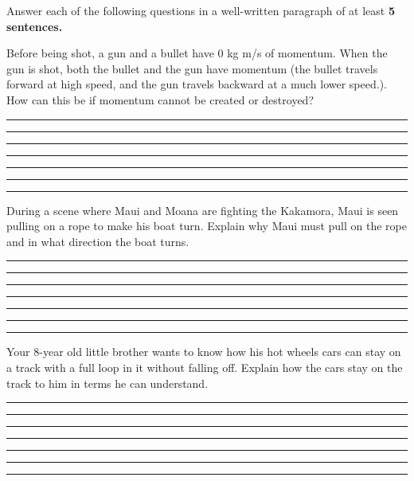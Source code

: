 \documentclass[12pt]{examdesign}
\begin{document}
		
\pagebreak
\begin{shortanswer}  [title={Essay Questions}, rearrange=no]
Answer each of the following questions in a well-written paragraph of at least\textbf{ 5 sentences.}  
	\begin{question}
	Before being shot, a gun and a bullet have 0 kg m/s of momentum.  When the gun is shot, both the bullet and the gun have momentum (the bullet travels forward at high speed, and the gun travels backward at a much lower speed.).  How can this be if momentum cannot be created or destroyed?
	\vspace{.25 in}
	\hrule
	\vspace{.25 in}
	\hrule
	\vspace{.25 in}
	\hrule
	\vspace{.25 in}
	\hrule
	\vspace{.25 in}
	\hrule
	\vspace{.25 in}
	\hrule
	\vspace{.25 in}
	\hrule
	\vspace{1cm}
		\end{question}
		\begin{question}
		During a scene where Maui and Moana are fighting the Kakamora, Maui is seen pulling on a rope to make his boat turn.  Explain why Maui must pull on the rope and in what direction the boat turns.  
		\vspace{.25 in}
		\hrule
		\vspace{.25 in}
		\hrule
		\vspace{.25 in}
		\hrule
		\vspace{.25 in}
		\hrule
		\vspace{.25 in}
		\hrule
		\vspace{.25 in}
		\hrule
		\vspace{.25 in}
		\hrule
			\vspace{.75cm}
	\end{question}
	
	\begin{question}
	Your 8-year old little brother wants to know how his hot wheels cars can stay on a track with a full loop in it without falling off.  Explain how the cars stay on the track to him in terms he can understand. 
	\vspace{.25 in}
	\hrule
	\vspace{.25 in}
	\hrule
	\vspace{.25 in}
	\hrule
	\vspace{.25 in}
	\hrule
	\vspace{.25 in}
	\hrule
	\vspace{.25 in}
	\hrule
	\vspace{.25 in}
	\hrule
	\vspace{1cm}
\end{question}


	
	
	
	\end{shortanswer}
\end{document}
